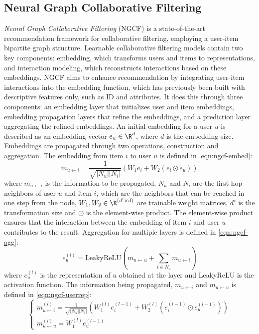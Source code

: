 \subsection{Neural Graph Collaborative Filtering}
\textit{Neural Graph Collaborative Filtering} (NGCF) is a state-of-the-art recommendation framework for collaborative filtering, employing a user-item bipartite graph structure.
Learnable collaborative filtering models contain two key components: embedding, which transforms users and items to representations, and interaction modeling, which reconstructs interactions based on these embeddings.
NGCF aims to enhance recommendation by integrating user-item interactions into the embedding function, which has previously been built with descriptive features only, such as ID and attributes.
It does this through three components: an embedding layer that initializes user and item embeddings, embedding propagation layers that refine the embeddings, and a prediction layer aggregating the refined embeddings.
An initial embedding for a user $u$ is described as an embedding vector $e_u \in \R^d$, where $d$ is the embedding size.
Embeddings are propagated through two operations, construction and aggregation.
The embedding from item $i$ to user $u$ is defined in \autoref{eqn:ngcf-embed}:
\begin{equation}\label{eqn:ngcf-embed}
    m_{u \leftarrow i} = \frac{1}{\sqrt{|N_u||N_i|}} (W_1e_i + W_2(e_i \odot e_u))
\end{equation}
where $m_{u \leftarrow i}$ is the information to be propagated, $N_u$ and $N_i$ are the first-hop neighbors of user $u$ and item $i$, which are the neighbors that can be reached in one step from the node, $W_1, W_2 \in \R^{(d' \times d)}$ are trainable weight matrices, $d'$ is the transformation size and $\odot$ is the element-wise product.
The element-wise product ensures that the interaction between the embedding of item $i$ and user $u$ contributes to the result.
Aggregation for multiple layers is defined in \autoref{eqn:ngcf-agg}:
\begin{equation}\label{eqn:ngcf-agg}
    e_{u}^{(l)} = \textrm{LeakyReLU}(m_{u \leftarrow u} + \sum_{i \in N_u} m_{u \leftarrow i})
\end{equation}
where $e_u^{(l)}$ is the representation of $u$ obtained at the layer and LeakyReLU is the activation function.
The information being propagated, $m_{u \leftarrow i}$ and $m_{u \leftarrow u}$ is defined in \autoref{eqn:ngcf-userrep}:
\begin{equation}\label{eqn:ngcf-userrep}
  \begin{cases}
    m_{u \leftarrow i}^{(l)} = \frac{1}{\sqrt{|N_u||N_i|}} (W_1^{(l)} e_i^{(l-1)} + W_2^{(l)} (e_i^{(l-1)} \odot e_u^{(l-1)}))\\
    m_{u \leftarrow u}^{(l)} = W_1^{(l)}e_u^{(l-1)}
  \end{cases}
\end{equation}

